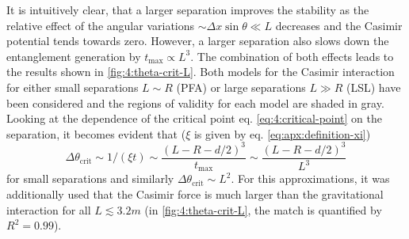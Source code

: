 It is intuitively clear, that a larger separation improves the stability as the relative effect of the angular variations $\sim \Delta x \sin\theta \ll L$ decreases and the Casimir potential tends towards zero.
However, a larger separation also slows down the entanglement generation by $t_\mathrm{max} \propto L^3$.
The combination of both effects leads to the results shown in \cref{fig:4:theta-crit-L}.
Both models for the Casimir interaction for either small separations $L \sim R$ (PFA) or large separations $L \gg R$ (LSL) have been considered and the regions of validity for each model are shaded in gray.
Looking at the dependence of the critical point eq. \eqref{eq:4:critical-point} on the separation, it becomes evident that ($\xi$ is given by eq. \eqref{eq:apx:definition-xi})
\begin{equation}
  \Delta \theta_\mathrm{crit} \sim 1/(\xi t) \sim \frac{(L - R - d/2)^3}{t_\mathrm{max}} \sim \frac{(L - R - d/2)^3}{L^3}
\end{equation}
for small separations and similarly $\Delta \theta_\mathrm{crit} \sim L^2$.
For this approximations, it was additionally used that the Casimir force is much larger than the gravitational interaction for all $L \lesssim 3.2\si{m}$ (in \cref{fig:4:theta-crit-L}, the match is quantified by $R^2 = 0.99$).

